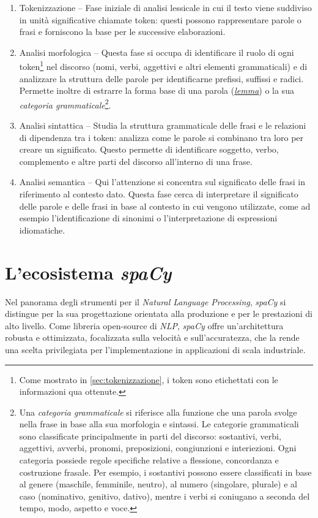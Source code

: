 \documentclass[12pt]{report}
\newcommand{\spacy}{\textsl{spaCy}\xspace}
\newcommand{\nlp}{\textsl{NLP}\xspace}
\begin{document}
\begin{enumerate}
\item \textsf{Tokenizzazione} -- Fase iniziale di analisi lessicale in cui il testo viene suddiviso in unità significative chiamate token: questi possono rappresentare parole o frasi e forniscono la base per le successive elaborazioni.
\item \textsf{Analisi morfologica} -- Questa fase si occupa di identificare il ruolo di ogni token\footnote{Come mostrato in \cref{sec:tokenizzazione}, i token sono etichettati con le informazioni qua ottenute.} nel discorso (nomi, verbi, aggettivi e altri elementi grammaticali) e di analizzare la struttura delle parole per identificarne prefissi, suffissi e radici. Permette inoltre di estrarre la forma base di una parola (\hyperref[fn:lemma]{\itshape lemma}) o la sua \textit{categoria grammaticale}\footnote{Una \textit{categoria grammaticale} si riferisce alla funzione che una parola svolge nella frase in base alla sua morfologia e sintassi. Le categorie grammaticali sono classificate principalmente in parti del discorso: sostantivi, verbi, aggettivi, avverbi, pronomi, preposizioni, congiunzioni e interiezioni. Ogni categoria possiede regole specifiche relative a flessione, concordanza e costruzione frasale. Per esempio, i sostantivi possono essere classificati in base al genere (maschile, femminile, neutro), al numero (singolare, plurale) e al caso (nominativo, genitivo, dativo), mentre i verbi si coniugano a seconda del tempo, modo, aspetto e voce.}.
\item \textsf{Analisi sintattica} -- Studia la struttura grammaticale delle frasi e le relazioni di dipendenza tra i token: analizza come le parole si combinano tra loro per creare un significato. Questo permette di identificare soggetto, verbo, complemento e altre parti del discorso all'interno di una frase.
\item \textsf{Analisi semantica} -- Qui l'attenzione si concentra sul significato delle frasi in riferimento al contesto dato. Questa fase cerca di interpretare il significato delle parole e delle frasi in base al contesto in cui vengono utilizzate, come ad esempio l'identificazione di sinonimi o l'interpretazione di espressioni idiomatiche.
\end{enumerate}


\section{L'ecosistema \spacy}
Nel panorama degli strumenti per il \textit{Natural Language Processing}, \spacy si distingue per la sua progettazione orientata alla produzione e per le prestazioni di alto livello. Come libreria open-source di \nlp, \spacy offre un'architettura robusta e ottimizzata, focalizzata sulla velocità e sull'accuratezza, che la rende una scelta privilegiata per l'implementazione in applicazioni di scala industriale.
\end{document}
